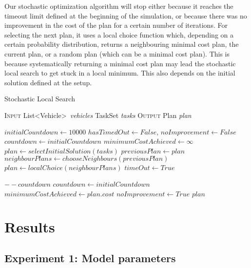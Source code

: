 \documentclass[10pt]{article}
\begin{document}
Our stochastic optimization algorithm will stop either because it reaches the timeout limit defined at the beginning of the simulation, or because there was no improvement in the cost of the plan for a certain number of iterations.
For selecting the next plan, it uses a local choice function which, depending on a certain probability distribution, returns a neighbouring minimal cost plan, the current plan, or a random plan (which can be a minimal cost plan). This is because systematically returning a minimal cost plan may lead the stochastic local search to get stuck in a local minimum. This also depends on the initial solution defined at the setup.

\begin{algorithm}[h]
\caption{Stochastic Local Search}
\begin{algorithmic}[0]
\Statex \textsc{Input}
\Statex \hspace{\algorithmicindent} List\textless Vehicle\textgreater\ \textit{vehicles} 
\Statex \hspace{\algorithmicindent} TaskSet \textit{tasks} 
\Statex \textsc{Output}
\Statex \hspace{\algorithmicindent} Plan \textit{plan} 

\State	
\State $initialCountdown \gets 10000$
\State $hasTimedOut \gets False$, $noImprovement \gets False$
\State $countdown \gets initialCountdown$
\State $minimumCostAchieved \gets  \infty$
\State $plan \gets  selectInitialSolution(tasks)$
\State
{}
\State $previousPlan \gets plan$
\State $neighbourPlans \gets chooseNeighbours(previousPlan)$
\State $plan \gets localChoice(neighbourPlans)$
\State
{} 
	\State $timeOut \gets True$
\EndIf

	\State $--countdown$
\Else
	\State $countdown \gets initialCountdown$
	\State $minimumCostAchieved \gets plan.cost$
\EndIf
{}
	\State $noImprovement \gets True$
\EndIf
\EndWhile
\State \Return $plan$
\end{algorithmic}
\end{algorithm}

\section{Results}

\subsection{Experiment 1: Model parameters}
\end{document}

